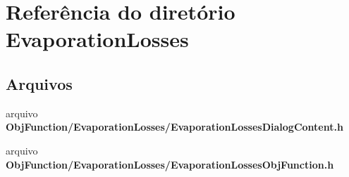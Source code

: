 \section{Referência do diretório Evaporation\+Losses}
\label{dir_60a0989cfdad25c93ea62c393e5efd35}
\subsection*{Arquivos}
\begin{DoxyCompactItemize}
\item 
arquivo {\bf Obj\+Function/\+Evaporation\+Losses/\+Evaporation\+Losses\+Dialog\+Content.\+h}
\item 
arquivo {\bf Obj\+Function/\+Evaporation\+Losses/\+Evaporation\+Losses\+Obj\+Function.\+h}
\end{DoxyCompactItemize}
